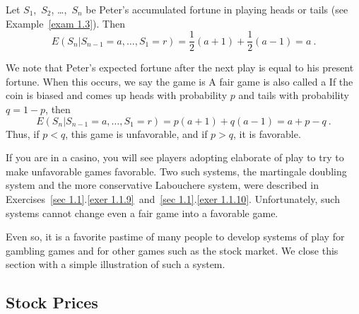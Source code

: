 \begin{example}\label{exam 6.11} Let $S_1$,~$S_2$, \dots,~$S_n$ be Peter's
accumulated fortune in playing heads or tails (see Example~\ref{exam 1.3}).  Then
$$ E(S_n | S_{n - 1} = a,\dots,S_1 = r) = \frac 12 (a + 1) + \frac 12 (a - 1) = a\ .
$$

We note that Peter's expected fortune after the next play is equal to his present
fortune.  When this occurs, we say the game is   A fair game is also
called a   If the coin is biased and comes up heads with
probability
$p$ and tails with probability $q = 1 - p$, then
$$ E(S_n | S_{n - 1} = a,\dots,S_1 = r) = p (a + 1) + q (a - 1) = a + p - q\ .
$$ Thus, if $p < q$, this game is unfavorable, and if $p > q$, it is favorable.
\end{example}

If you are in a casino, you will see players adopting elaborate  of play to try to make unfavorable games favorable.  Two such systems, the martingale
doubling system and the more conservative Labouchere system, were described in
Exercises~\ref{sec 1.1}.\ref{exer 1.1.9}~and~\ref{sec 1.1}.\ref{exer 1.1.10}. 
Unfortunately, such systems cannot change even a fair game into a favorable game.

Even so, it is a favorite pastime of many people to develop systems of play for
gambling games and for other games such as the stock market.  We close this section
with a simple illustration of such a system.

\subsection*{Stock Prices}

